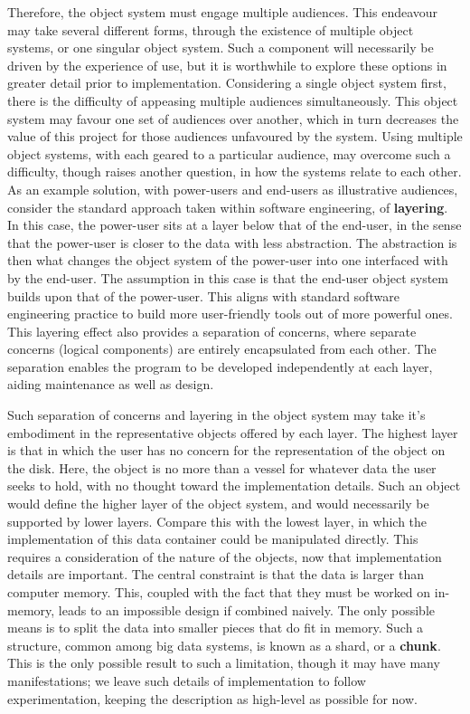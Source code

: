 Therefore, the object system must engage multiple audiences. This
endeavour may take several different forms, through the existence of
multiple object systems, or one singular object system. Such a component
will necessarily be driven by the experience of use, but it is
worthwhile to explore these options in greater detail prior to
implementation. Considering a single object system first, there is the
difficulty of appeasing multiple audiences simultaneously. This object
system may favour one set of audiences over another, which in turn
decreases the value of this project for those audiences unfavoured by
the system. Using multiple object systems, with each geared to a
particular audience, may overcome such a difficulty, though raises
another question, in how the systems relate to each other. As an example
solution, with power-users and end-users as illustrative audiences,
consider the standard approach taken within software engineering, of
\textbf{layering}. In this case, the power-user sits at a layer below
that of the end-user, in the sense that the power-user is closer to the
data with less abstraction. The abstraction is then what changes the
object system of the power-user into one interfaced with by the
end-user. The assumption in this case is that the end-user object system
builds upon that of the power-user. This aligns with standard software
engineering practice to build more user-friendly tools out of more
powerful ones. This layering effect also provides a separation of
concerns, where separate concerns (logical components) are entirely
encapsulated from each other. The separation enables the program to be
developed independently at each layer, aiding maintenance as well as
design.

Such separation of concerns and layering in the object system may take
it's embodiment in the representative objects offered by each layer. The
highest layer is that in which the user has no concern for the
representation of the object on the disk. Here, the object is no more
than a vessel for whatever data the user seeks to hold, with no thought
toward the implementation details. Such an object would define the
higher layer of the object system, and would necessarily be supported by
lower layers. Compare this with the lowest layer, in which the
implementation of this data container could be manipulated directly.
This requires a consideration of the nature of the objects, now that
implementation details are important. The central constraint is that the
data is larger than computer memory. This, coupled with the fact that
they must be worked on in-memory, leads to an impossible design if
combined naively. The only possible means is to split the data into
smaller pieces that do fit in memory. Such a structure, common among big
data systems, is known as a shard, or a \textbf{chunk}. This is the only
possible result to such a limitation, though it may have many
manifestations; we leave such details of implementation to follow
experimentation, keeping the description as high-level as possible for
now.

